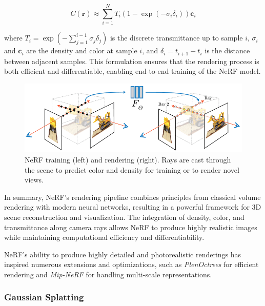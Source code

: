 \begin{equation}
C(\mathbf{r}) \approx \sum_{i=1}^N T_i \left(1 - \exp(-\sigma_i \delta_i)\right) \mathbf{c}_i
\end{equation}

where \( T_i = \exp\left(-\sum_{j=1}^{i-1} \sigma_j \delta_j\right) \) is the discrete transmittance up to sample \( i \), \( \sigma_i \) and \( \mathbf{c}_i \) are the density and color at sample \( i \), and \( \delta_i = t_{i+1} - t_i \) is the distance between adjacent samples. This formulation ensures that the rendering process is both efficient and differentiable, enabling end-to-end training of the NeRF model.

\begin{figure}[ht]
    \centering
    \includegraphics[width=1\linewidth]{assets/nerf_algo.png}
    \caption{NeRF training (left) and rendering (right). Rays are cast through the scene to predict color and density for training or to render novel views.}
    \label{fig:nerf-rays}
\end{figure}

In summary, NeRF's rendering pipeline combines principles from classical volume rendering with modern neural networks, resulting in a powerful framework for 3D scene reconstruction and visualization. The integration of density, color, and transmittance along camera rays allows NeRF to produce highly realistic images while maintaining computational efficiency and differentiability.

NeRF's ability to produce highly detailed and photorealistic renderings has inspired numerous extensions and optimizations, such as \textit{PlenOctrees} \citep{yu2021plenoctrees} for efficient rendering and \textit{Mip-NeRF} \citep{barron2021mipnerf} for handling multi-scale representations.


\subsubsection{Gaussian Splatting}

